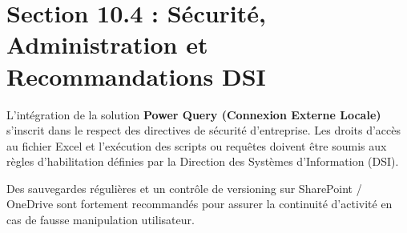 \documentclass[12pt,a4paper]{report}
\begin{document}
\section{Section 10.4 : Sécurité, Administration et Recommandations DSI}
L'intégration de la solution \textbf{Power Query (Connexion Externe Locale)} s'inscrit dans le respect des directives de sécurité d'entreprise. Les droits d'accès au fichier Excel et l'exécution des scripts ou requêtes doivent être soumis aux règles d'habilitation définies par la Direction des Systèmes d'Information (DSI).

Des sauvegardes régulières et un contrôle de versioning sur SharePoint / OneDrive sont fortement recommandés pour assurer la continuité d'activité en cas de fausse manipulation utilisateur.
\end{document}
